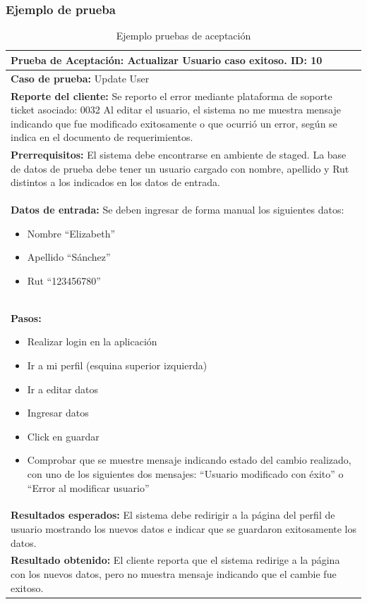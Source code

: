 \subsubsection{Ejemplo de prueba}

\begin{table}[H]
    \caption[Ejemplo pruebas de aceptación] {Ejemplo pruebas de aceptación}
    \label{tbl:ejemplo pruebas de aceptación}
    \begin{tabular}{|p{}|}
        \hline
        \textbf{Prueba de Aceptación: Actualizar Usuario caso exitoso. \hfill ID: 10} \\
    	\hline
    	\hline
    	\textbf{Caso de prueba:} Update User\\ \hline
    	\textbf{Reporte del cliente:} Se reporto el error mediante plataforma de soporte ticket asociado: 0032
			Al editar el usuario, el sistema no me muestra mensaje indicando que fue modificado exitosamente o que ocurrió un error, según se indica en el documento de requerimientos. \\ \hline
    	\textbf{Prerrequisitos:} El sistema debe encontrarse en ambiente de staged. La base de datos de prueba debe tener un usuario cargado con nombre, apellido y Rut distintos a los indicados en los datos de entrada.\\ \hline
		\textbf{Datos de entrada:} Se deben ingresar de forma manual los siguientes datos:
		\begin{itemize}
			\item Nombre “Elizabeth”
			\item Apellido “Sánchez”
			\item Rut “123456780”
		\end{itemize} \\ \hline
		\textbf{Pasos:} 
		\begin{itemize}
			\item Realizar login en la aplicación
			\item Ir a mi perfil (esquina superior izquierda) 
			\item Ir a editar datos
			\item Ingresar datos
			\item Click en guardar
			\item Comprobar que se muestre mensaje indicando estado del cambio realizado, con uno de los siguientes dos mensajes: “Usuario modificado con éxito” o “Error al modificar usuario”  

		\end{itemize}\\ \hline
		\textbf{Resultados esperados:} El sistema debe redirigir a la página del perfil de usuario mostrando los nuevos datos e indicar que se guardaron exitosamente los datos.  \\ \hline
		\textbf{Resultado obtenido:} El cliente reporta que el sistema redirige a la página con los nuevos datos, pero no muestra mensaje indicando que el cambie fue exitoso.\\ \hline
    \end{tabular}
\end{table}